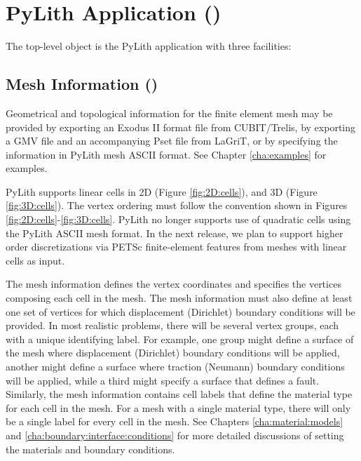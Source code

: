 \section{PyLith Application (\protect{})}

The top-level object is the PyLith application with three facilities:
\begin{inventory}
\end{inventory}


\subsection{Mesh Information ()}

Geometrical and topological information for the finite element mesh
may be provided by exporting an Exodus II format file from
CUBIT/Trelis, by exporting a GMV file and an accompanying Pset file
from LaGriT, or by specifying the information in PyLith mesh ASCII
format. See Chapter \vref{cha:examples} for examples.

PyLith supports linear cells in 2D (Figure \vref{fig:2D:cells}), and
3D (Figure \vref{fig:3D:cells}).  The vertex ordering must follow the
convention shown in Figures \vref{fig:2D:cells}-\vref{fig:3D:cells}.
PyLith no longer supports use of quadratic cells using the PyLith
ASCII mesh format. In the next release, we plan to support higher
order discretizations via PETSc finite-element features from meshes
with linear cells as input.

The mesh information defines the vertex coordinates and specifies
the vertices composing each cell in the mesh. The mesh information
must also define at least one set of vertices for which displacement
(Dirichlet) boundary conditions will be provided. In most realistic
problems, there will be several vertex groups, each with a unique
identifying label. For example, one group might define a surface of
the mesh where displacement (Dirichlet) boundary conditions will be
applied, another might define a surface where traction (Neumann) boundary
conditions will be applied, while a third might specify a surface
that defines a fault. Similarly, the mesh information contains cell
labels that define the material type for each cell in the mesh. For
a mesh with a single material type, there will only be a single label
for every cell in the mesh. See Chapters \vref{cha:material:models}
and \vref{cha:boundary:interface:conditions} for more detailed discussions
of setting the materials and boundary conditions.

